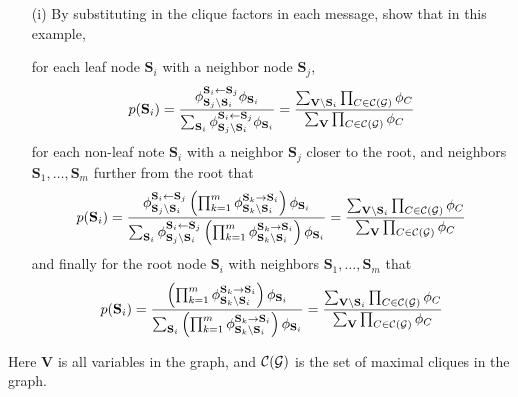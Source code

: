 \documentclass[11pt]{article}
\renewcommand{\vec}[1]{\mathbf{#1}}
\begin{document}
\begin{itemize}
\item[(i)] By substituting in the clique factors in each message, show that in this example,

for each leaf node $\vec{S}_i$ with a neighbor node $\vec{S}_j$,
{\small
\begin{align*}
p(\vec{S}_i) =
\frac{
\phi^{\vec{S}_i \gets \vec{S}_j}_{\vec{S}_j \setminus \vec{S}_i} \phi_{\vec{S}_i}
}{
\sum_{\vec{S}_i}
\phi^{\vec{S}_i \gets \vec{S}_j}_{\vec{S}_j \setminus \vec{S}_i} \phi_{\vec{S}_i}
}
=
\frac{
\sum_{\vec{V} \setminus \vec{S}_i} \prod_{C \in {\cal C}({\cal G})} \phi_C
}{
\sum_{\vec{V}} \prod_{C \in {\cal C}({\cal G})} \phi_C
}
\end{align*}
}
for each non-leaf note $\vec{S}_i$ with a neighbor $\vec{S}_j$ closer to the root, and neighbors $\vec{S}_1, \ldots, \vec{S}_m$ further from the root that
{\small
\begin{align*}
p(\vec{S}_i) =
\frac{
\phi^{\vec{S}_i \gets \vec{S}_j}_{\vec{S}_j \setminus \vec{S}_i} 
\left( \prod_{k=1}^m \phi^{\vec{S}_k \to \vec{S}_i}_{\vec{S}_k \setminus \vec{S}_i} \right) \phi_{\vec{S}_i}
}{
\sum_{\vec{S}_i} \phi^{\vec{S}_i \gets \vec{S}_j}_{\vec{S}_j \setminus \vec{S}_i} 
\left( \prod_{k=1}^m \phi^{\vec{S}_k \to \vec{S}_i}_{\vec{S}_k \setminus \vec{S}_i} \right) \phi_{\vec{S}_i}
}
=
\frac{
\sum_{\vec{V} \setminus \vec{S}_i} \prod_{C \in {\cal C}({\cal G})} \phi_C
}{
\sum_{\vec{V}} \prod_{C \in {\cal C}({\cal G})} \phi_C
}
\end{align*}
}
and finally for the root node $\vec{S}_i$ with neighbors $\vec{S}_1, \ldots, \vec{S}_m$ that
{\small
\begin{align*}
p(\vec{S}_i) =
\frac{
\left( \prod_{k=1}^m \phi^{\vec{S}_k \to \vec{S}_i}_{\vec{S}_k \setminus \vec{S}_i} \right) \phi_{\vec{S}_i}
}{
\sum_{\vec{S}_i} \left( \prod_{k=1}^m \phi^{\vec{S}_k \to \vec{S}_i}_{\vec{S}_k \setminus \vec{S}_i} \right) \phi_{\vec{S}_i}
}
=
\frac{
\sum_{\vec{V} \setminus \vec{S}_i} \prod_{C \in {\cal C}({\cal G})} \phi_C
}{
\sum_{\vec{V}} \prod_{C \in {\cal C}({\cal G})} \phi_C
}
\end{align*}
}
\end{itemize}

Here $\vec{V}$ is all variables in the graph, and ${\cal C}({\cal G})$ is the set of maximal cliques in the graph.
\end{document}
